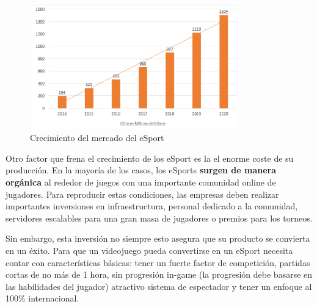 \begin{figure}[h]
    \centering
    \includegraphics[width=0.8\textwidth]{images/estadodelarte/mercado/crecimiento-esport}
    \caption{Crecimiento del mercado del eSport}
    \label{crecimiento-esport}
\end{figure}

Otro factor que frena el crecimiento de los eSport es la el enorme coste de su producción. En la mayoría de los casos, los eSports \textbf{surgen de manera orgánica} al rededor de juegos con una importante comunidad online de jugadores. Para reproducir estas condiciones, las empresas deben realizar importantes inversiones en infraestructura, personal dedicado a la comunidad, servidores escalables para una gran masa de jugadores o premios para los torneos. 

Sin embargo, esta inversión no siempre esto asegura que su producto se convierta en un éxito. Para que un videojuego pueda convertirse en un eSport necesita contar con características básicas: tener un fuerte factor de competición, partidas cortas de no más de 1 hora, sin progresión in-game (la progresión debe basarse en las habilidades del jugador) atractivo sistema de espectador y tener un enfoque al 100\% internacional.

